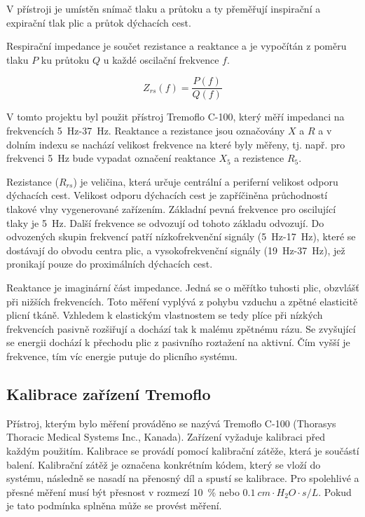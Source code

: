 V přístroji je umístěn snímač tlaku a průtoku a ty přeměřují inspirační a expirační tlak plic a průtok dýchacích cest. 

Respirační impedance je součet rezistance a reaktance a je vypočítán z poměru tlaku  $P$ ku průtoku $Q$ u každé oscilační frekvence $f$. \cite{Vlcek2018}

\begin{equation}
	\label{rce:2}
	Z_{rs}(f) = \frac{P(f)}{Q(f)}
\end{equation}


V tomto projektu byl použit přístroj Tremoflo C-100, který měří impedanci na frekvencích \SI{5}{Hz}-\SI{37}{Hz}. Reaktance a rezistance jsou označovány $X$ a $R$ a v dolním indexu se nachází velikost frekvence na které byly měřeny, tj. např. pro frekvenci \SI{5}{Hz} bude vypadat označení reaktance $X_5$ a rezistence $R_5$. 


Rezistance ($R_{rs}$) je veličina, která určuje centrální a periferní velikost odporu dýchacích cest. Velikost odporu dýchacích cest je zapříčiněna průchodností tlakové vlny vygenerované zařízením. Základní pevná frekvence pro oscilující tlaky je 5~Hz. Další frekvence se odvozují od tohoto základu odvozují. Do odvozených skupin frekvencí patří nízkofrekvenční signály (\SI{5}{Hz}-\SI{17}{Hz}), které se dostávají do obvodu centra plic, a vysokofrekvenční signály (\SI{19}{Hz}-\SI{37}{Hz}), jež pronikají pouze do proximálních dýchacích cest. 

Reaktance je imaginární část impedance. Jedná se o měřítko tuhosti plic, obzvlášť při nižších frekvencích. Toto měření vyplývá z pohybu vzduchu  a zpětné elasticitě plicní tkáně. Vzhledem k elastickým vlastnostem se tedy plíce při nízkých frekvencích pasivně rozšiřují a dochází tak k malému zpětnému rázu. Se zvyšující se energii dochází k přechodu plic z pasivního roztažení na aktivní. Čím vyšší je frekvence, tím víc energie putuje do plicního systému. 


\subsection{Kalibrace zařízení Tremoflo}\label{kalibrace}
Přístroj, kterým bylo měření prováděno se nazývá Tremoflo C-100 (Thorasys Thoracic Medical Systems Inc., Kanada). Zařízení vyžaduje kalibraci před každým použitím. Kalibrace se provádí pomocí kalibrační zátěže, která je součástí balení. Kalibrační zátěž je označena konkrétním kódem, který se vloží do systému, následně  se nasadí na přenosný díl a spustí se kalibrace. Pro spolehlivé a přesné měření musí být přesnost 
v rozmezí \SI{10}{\%} nebo $\SI{0,1}{cm \cdot H_{2}O \cdot s/L}$. Pokud je tato podmínka splněna může se provést měření. \cite{Vlcek2018}


